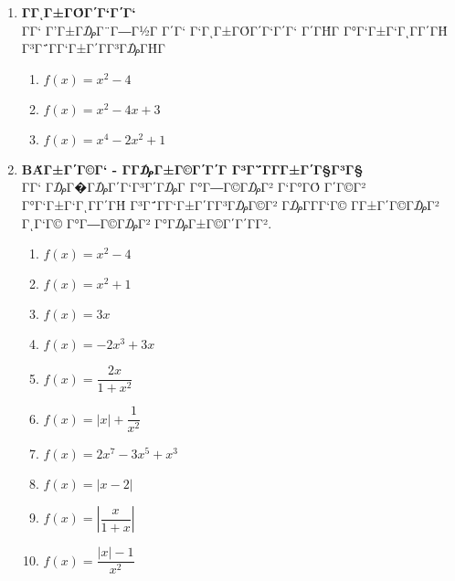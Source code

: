 \documentclass[a4paper,11pt]{article}
\begin{document}
\begin{enumerate}[label=\bf\textcolor{royalblue}{{\large \arabic*.}},
itemsep=5mm]
\begin{enumerate}[label=\roman*.,itemsep=0mm]
\item $ f(x)=x^2-4x+5 $ Γ°Γ‘ΓΓ±Γ­Γ₯Γ© Γ₯Γ«ΓΓ·Γ©Γ³Γ΄Γ§ Γ΄Γ©Γ¬Γ Γ£Γ©Γ‘ $ x=2 $.
\item $ f(x)=4x-x^2 $ Γ°Γ‘ΓΓ±Γ­Γ₯Γ© Γ¬ΓΓ£Γ©Γ³Γ΄Γ§ Γ΄Γ©Γ¬Γ Γ£Γ©Γ‘ $ x=2 $.
\item $ f(x)=x^4-6x^3+10x^2-6x+9 $ Γ°Γ‘ΓΓ±Γ­Γ₯Γ© Γ₯Γ«ΓΓ·Γ©Γ³Γ΄Γ§ Γ΄Γ©Γ¬Γ Γ£Γ©Γ‘ $ x=3 $.
\item $ f(x)=-x^3+4x^2+3x\;, x>0 $ Γ°Γ‘ΓΓ±Γ­Γ₯Γ© Γ¬ΓΓ£Γ©Γ³Γ΄Γ§ Γ΄Γ©Γ¬Γ Γ£Γ©Γ‘ $ x=3 $.
\item $ f(x)=|x-2|-1 $ Γ°Γ‘ΓΓ±Γ­Γ₯Γ© Γ₯Γ«ΓΓ·Γ©Γ³Γ΄Γ§ Γ΄Γ©Γ¬Γ Γ£Γ©Γ‘ $ x=2 $.
\end{enumerate}
\newpage
\noindent
\item \textbf{ΓΓͺΓ±ΓΌΓ΄Γ‘Γ΄Γ‘}\\
ΓΓ‘ Γ’Γ±Γ₯Γ¨Γ―Γ½Γ­ Γ΄Γ‘ Γ‘ΓͺΓ±ΓΌΓ΄Γ‘Γ΄Γ‘ Γ΄ΓΉΓ­ Γ°Γ‘Γ±Γ‘ΓͺΓΓ΄ΓΉ Γ³Γ΅Γ­Γ‘Γ±Γ΄ΓΓ³Γ₯ΓΉΓ­
\begin{multicols}{3}
\begin{enumerate}[label=\roman*.,itemsep=0mm]
\item $ f(x)=x^2-4 $
\item $ f(x)=x^2-4x+3 $
\item $ f(x)=x^4-2x^2+1 $
\end{enumerate}\end{multicols}
\item \textbf{ΒΆΓ±Γ΄Γ©Γ‘ - ΓΓ₯Γ±Γ©Γ΄Γ΄Γ Γ³Γ΅Γ­ΓΓ±Γ΄Γ§Γ³Γ§}\\
ΓΓ‘ Γ₯Γ�Γ₯Γ΄Γ‘Γ³Γ΄Γ₯Γ Γ°Γ―Γ©Γ₯Γ² Γ‘Γ°ΓΌ Γ΄Γ©Γ² Γ°Γ‘Γ±Γ‘ΓͺΓΓ΄ΓΉ Γ³Γ΅Γ­Γ‘Γ±Γ΄ΓΓ³Γ₯Γ©Γ² Γ₯ΓΓ­Γ‘Γ© ΓΓ±Γ΄Γ©Γ₯Γ² ΓͺΓ‘Γ© Γ°Γ―Γ©Γ₯Γ² Γ°Γ₯Γ±Γ©Γ΄Γ΄ΓΓ².
\begin{multicols}{3}
\begin{enumerate}[label=\roman*.,itemsep=0mm]
\item $ f(x)=x^2-4 $
\item $ f(x)=x^2+1 $
\item $ f(x)=3x $
\item $ f(x)=-2x^3+3x $
\item $ f(x)=\dfrac{2x}{1+x^2} $
\item $ f(x)=|x|+\dfrac{1}{x^2} $
\item $ f(x)=2x^7-3x^5+x^3 $
\item $ f(x)=|x-2| $
\item $ f(x)=\left|\dfrac{x}{1+x}\right| $
\item $ f(x)=\dfrac{\left|x\right|-1}{x^2} $
\end{enumerate}\end{multicols}
\begin{tabular}{lr}

\end{tabular}
\end{enumerate}
\end{document}
